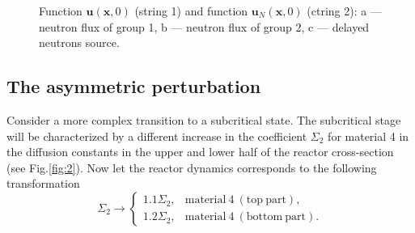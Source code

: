 \documentclass[authoryear]{elsarticle}
\begin{document}
\begin{figure}[!h]
\begin{center}
\begin{minipage}{0.3\linewidth}
 \\
\end{minipage}

\begin{minipage}{0.051\linewidth}
\center{~} \\
\end{minipage}
\hfill
\begin{minipage}{0.3\linewidth}
 \\
\end{minipage}
\hfill
\begin{minipage}{0.3\linewidth}
 \\
\end{minipage}
\hfill
\begin{minipage}{0.3\linewidth}
 \\
\end{minipage}
\hfill

\caption{Function $\bm u(\bm x, 0)$ (string 1) and function  $\bm u_N(\bm x, 0)$ (ctring 2):
a --- neutron flux of group 1, b --- neutron flux of group 2, c --- delayed neutrons source.}
\label{fig:11}
  \end{center}
\end{figure}

\subsection{The asymmetric perturbation} 

Consider a more complex transition to a subcritical state. The subcritical stage will be characterized by a different increase in the coefficient 
$\Sigma_2$ for material 4 in the diffusion constants in the upper and lower half of the reactor cross-section (see Fig.\ref{fig:2}). Now let the reactor dynamics corresponds to the following transformation
\[
 \Sigma_2 \longrightarrow 
 \begin{cases}
 1.1 \Sigma_2, & \mathrm{material \ 4 \ (top \ part)}, \\
 1.2 \Sigma_2, & \mathrm{material \ 4 \ (bottom \ part)}.
 \end{cases}
\] 
\end{document}
